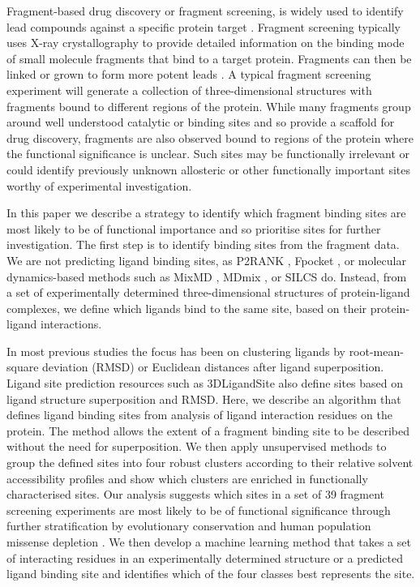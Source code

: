 Fragment-based drug discovery or fragment screening, is widely used to identify lead compounds against a specific protein target \cite{MURRAY_2009_FBDD}. Fragment screening typically uses X-ray crystallography to provide detailed information on the binding mode of small molecule fragments that bind to a target protein. Fragments can then be linked or grown to form more potent leads \cite{CONGREVE_2003_RO3, REES_2004_FBLD, SCHIEBEL_2016_FRAGMENTS}. A typical fragment screening experiment will generate a collection of three-dimensional structures with fragments bound to different regions of the protein. While many fragments group around well understood catalytic or binding sites and so provide a scaffold for drug discovery, fragments are also observed bound to regions of the protein where the functional significance is unclear. Such sites may be functionally irrelevant or could identify previously unknown allosteric or other functionally important sites worthy of experimental investigation. 

In this paper we describe a strategy to identify which fragment binding sites are most likely to be of functional importance and so prioritise sites for further investigation. The first step is to identify binding sites from the fragment data. We are not predicting ligand binding sites, as P2RANK \cite{KRIVAK_2018_P2RANK}, Fpocket \cite{GUILLOUX_2009_FPOCKET}, or molecular dynamics-based methods such as MixMD \cite{LEXA_2011_FLEXIBILITY, GHANAKOTA_2018_MIXMD}, MDmix \cite{ALVAREZ_2014_MIXMD}, or SILCS \cite{FALLER_2015_SILCS} do. Instead, from a set of experimentally determined three-dimensional structures of protein-ligand complexes, we define which ligands bind to the same site, based on their protein-ligand interactions.

In most previous studies the focus has been on clustering ligands by  root-mean-square deviation (RMSD) \cite{SHIN_2005_PDBLIGAND} or Euclidean distances \cite{KOZAKOV_2005_CLUSTERING} after ligand superposition. Ligand site prediction resources such as 3DLigandSite \cite{WASS_2010_3DLIGANDSITE, MCGREIG_2022_3DLIGANDSITE} also define sites based on ligand structure superposition and RMSD. Here, we describe an algorithm that defines ligand binding sites from analysis of ligand interaction residues on the protein. The method allows the extent of a fragment binding site to be described without the need for superposition. We then apply unsupervised methods to group the defined sites into four robust clusters according to their relative solvent accessibility profiles and show which clusters are enriched in functionally characterised sites. Our analysis suggests which sites in a set of 39 fragment screening experiments are most likely to be of functional significance through further stratification by evolutionary conservation and human population missense depletion \cite{MACGOWAN_2017_VARIANTS, MACGOWAN_2024_VARIANTS}. We then develop a machine learning method that takes a set of interacting residues in an experimentally determined structure or a predicted ligand binding site and identifies which of the four classes best represents the site. 

